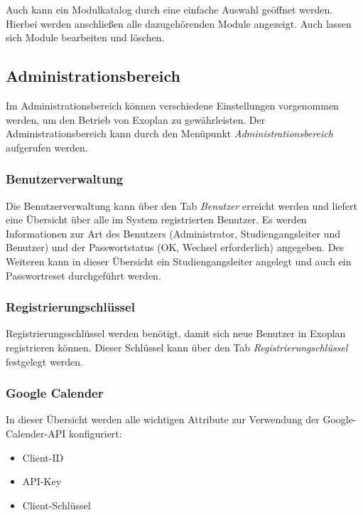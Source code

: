 Auch kann ein Modulkatalog durch eine einfache Auswahl geöffnet werden. Hierbei werden anschließen alle dazugehörenden Module angezeigt. Auch lassen sich Module bearbeiten und löschen.

\subsection{Administrationsbereich}

Im Administrationsbereich können verschiedene Einstellungen vorgenommen werden, um den Betrieb von Exoplan zu gewährleisten. Der Administrationsbereich kann durch den Menüpunkt \textit{Administrationsbereich} aufgerufen werden.

\subsubsection{Benutzerverwaltung}

Die Benutzerverwaltung kann über den Tab \textit{Benutzer} erreicht werden und liefert eine Übersicht über alle im System registrierten Benutzer. Es werden Informationen zur Art des Benutzers (Administrator, Studiengangsleiter und Benutzer) und der Passwortstatus (OK, Wechsel erforderlich) angegeben. Des Weiteren kann in dieser Übersicht ein Studiengangsleiter angelegt und auch ein Passwortreset durchgeführt werden.

\subsubsection{Registrierungschlüssel}

Registrierungsschlüssel werden benötigt, damit sich neue Benutzer in Exoplan registrieren können. Dieser Schlüssel kann über den Tab \textit{Registrierungschlüssel} festgelegt werden.

\subsubsection{Google Calender}

In dieser Übersicht werden alle wichtigen Attribute zur Verwendung der Google-Calender-API konfiguriert:
\begin{itemize}
	\item Client-ID
	\item API-Key
	\item Client-Schlüssel
\end{itemize}
